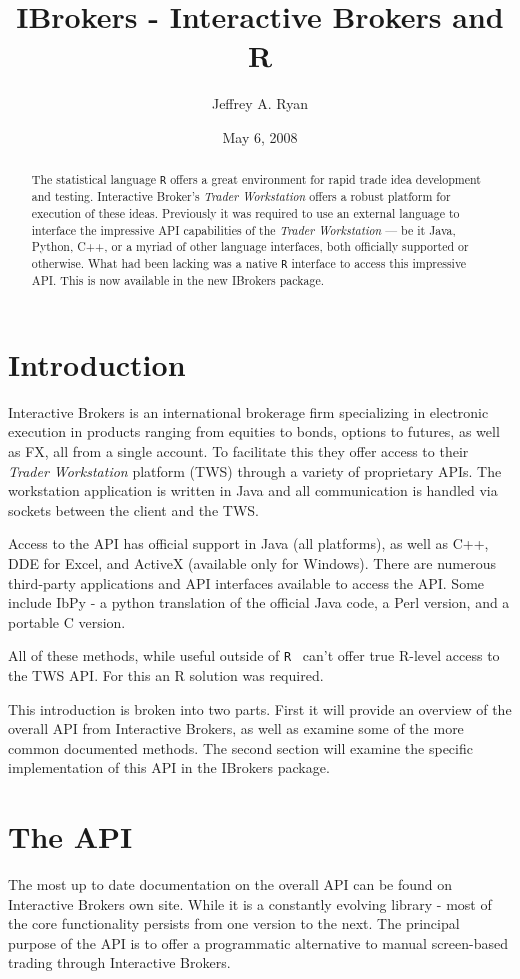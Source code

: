 \documentclass{article}
\title{\bf IBrokers - Interactive Brokers and R }
\author{Jeffrey A. Ryan}
\date{May 6, 2008}
\begin{document}
\maketitle
\tableofcontents

\begin{abstract}
The statistical language {\tt R}
offers a great environment for rapid trade
idea development and testing. Interactive Broker's
\emph{Trader Workstation} offers a
robust platform for execution of these ideas.
Previously it was required to use an external
language to interface the impressive API
capabilities of the \emph{Trader Workstation} --- be
it Java, Python, C++, or a myriad of other
language interfaces, both officially supported
or otherwise.
What had been lacking was a native {\tt R} interface
to access this impressive API.  This is now available
in the new IBrokers package.
\end{abstract}

\section{Introduction}
Interactive Brokers \cite{TWS} is an international brokerage
firm specializing in electronic execution in
products ranging from equities to bonds, options to futures,
as well as FX, all from a single account. To facilitate
this they offer access to their \emph{Trader Workstation}
platform (TWS) through a variety of proprietary APIs.
The workstation application is written
in Java and all communication is handled via sockets
between the client and the TWS.

Access to the API has official support in
Java (all platforms), as well as C++, DDE for Excel, and ActiveX
(available only for Windows). There are numerous third-party
applications and API interfaces available to access the
API. Some include IbPy - a python translation of the
official Java code, a Perl version, and a portable C version.

All of these methods, while useful outside of {\tt R}~\cite{R}
can't offer true R-level access to the TWS API.  For this an
R solution was required.

This introduction is broken into two parts. First
it will provide an overview of the overall
API from Interactive Brokers, as well as examine some of the
more common documented methods. The second section will
examine the specific implementation of this API in the
IBrokers \cite{IBrokers} package.

\section{The API}
The most up to date documentation on the overall API can be found
on Interactive Brokers own site. While it is a constantly evolving
library - most of the core functionality persists from
one version to the next. The principal purpose of the API is to
offer a programmatic alternative to manual screen-based trading
through Interactive Brokers.
\end{document}
